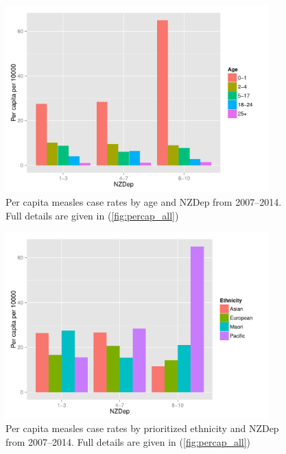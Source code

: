\documentclass{article}
\begin{document}
\begin{figure}[H]
     \begin{center}
     \includegraphics[width=0.9\textwidth]{percap_nzdep_age.pdf}
     \end{center}
     \caption{Per capita measles case rates by age and NZDep from 2007--2014. Full details are given in (\autoref{fig:percap_all})}
     \label{fig:PerCapAgeNzdep}
\end{figure}

\begin{figure}[H]
     \begin{center}
     \includegraphics[width=0.9\textwidth]{percap_eth_nzdep.pdf}
     \end{center}
     \caption{Per capita measles case rates by prioritized ethnicity and NZDep from 2007--2014. Full details are given in (\autoref{fig:percap_all})}
     \label{fig:PerCapNzdepEth}
\end{figure}
\end{document}
